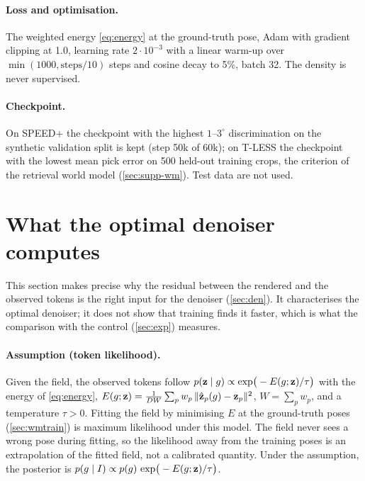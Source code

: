 \paragraph{Loss and optimisation.}
The weighted energy \cref{eq:energy} at the ground-truth pose, Adam with gradient clipping at 1.0, learning rate $2\cdot10^{-3}$ with a
linear warm-up over $\min(1000, \text{steps}/10)$ steps and cosine decay to 5\%, batch 32. The density is never supervised.

\paragraph{Checkpoint.}
On SPEED+ the checkpoint with the highest $1$--$3^\circ$ discrimination on the synthetic validation split is kept (step 50k of
60k); on T-LESS the checkpoint with the lowest mean pick error on 500 held-out training crops, the criterion of the retrieval world
model (\cref{sec:supp-wm}). Test data are not used.

\section{What the optimal denoiser computes}
\label{sec:supp-theory}
This section makes precise why the residual between the rendered and the observed tokens is the right input for the denoiser
(\cref{sec:den}). It characterises the optimal denoiser; it does not show that training finds it faster, which is what the
comparison with the control (\cref{sec:exp}) measures.

\paragraph{Assumption (token likelihood).}
Given the field, the observed tokens follow $p(\mathbf{z}\mid g)\propto\exp\!\big(-E(g;\mathbf{z})/\tau\big)$ with the energy of
\cref{eq:energy}, $E(g;\mathbf{z})=\frac{1}{DW}\sum_p w_p\,\|\hat{\mathbf{z}}_p(g)-\mathbf{z}_p\|^2$, $W=\sum_p w_p$, and a temperature $\tau>0$.
Fitting the field by minimising $E$ at the ground-truth poses (\cref{sec:wmtrain}) is maximum likelihood under this model. The field
never sees a wrong pose during fitting, so the likelihood away from the training poses is an extrapolation of the fitted field, not
a calibrated quantity. Under the assumption, the posterior is $p(g\mid I)\propto p(g)\,\exp\!\big(-E(g;\mathbf{z})/\tau\big)$.

